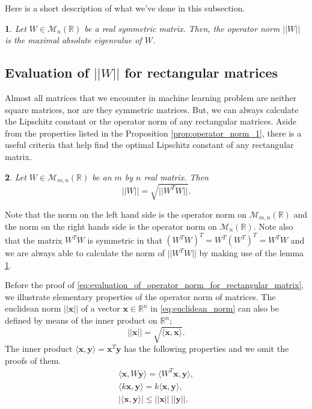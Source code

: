 \documentclass[12pt]{report}
\numberwithin{figure}{chapter}
\theoremstyle{plain}
\newtheorem{theorem}{\protect\theoremname}[chapter]
\theoremstyle{definition}
\theoremstyle{corollary}
\theoremstyle{definition}
\theoremstyle{plain}
\theoremstyle{definition}
\theoremstyle{plain}
\newtheorem{lemma}[theorem]{\protect\lemmaname}
\providecommand{\lemmaname}{Lemma}
\providecommand{\theoremname}{Theorem}
\newcommand\bx{\ensuremath{\boldsymbol x}}
\newcommand\by{\ensuremath{\boldsymbol y}}
\begin{document}
Here is a short description of what we've done in this subsection.
\begin{lemma}\label{lemm:evaluation_for_square_matrices}
Let \(W\in\mathcal M_n(\mathbb R)\) be a real symmetric matrix.
Then, the operator norm \(||W||\) is the maximal absolute eigenvalue of \(W\).
\end{lemma}

%
\subsection{Evaluation of \(||W||\) for rectangular matrices}\label{sec:evaluation_for_rectangular_matrices}
Almost all matrices that we encounter in machine learning problem are neither square matrices, nor are they symmetric matrices.
But, we can always calculate the Lipschitz constant or the operator norm of any rectangular matrices.
Aside from the properties listed in the Proposition \ref{prop:operator_norm_1}, there is a useful criteria that help find the optimal Lipschitz constant of any rectangular matrix.

\begin{theorem}\label{theo:evaluation_for_rectangular_matrices}
\cite{KC}
Let \(W\in\mathcal M_{m,n}(\mathbb R)\) be an \(m\) by \(n\) real matrix.
Then
\begin{equation}\label{eq:evaluation_of_operator_norm_for_rectangular_matrix}
||W||=\sqrt{||W^TW||}.
\end{equation}
\end{theorem}

Note that the norm on the left hand side is the operator norm on \(\mathcal M_{m,n}(\mathbb R)\) and the norm on the right hands side is the operator norm on \(\mathcal M_n(\mathbb R)\).
Note also that the matrix \(W^TW\) is symmetric in that \((W^TW)^T=W^T(W^T)^T=W^TW\) and we are always able to calculate the norm of \(||W^TW||\) by making use of the lemma \ref{lemm:evaluation_for_square_matrices}.

Before the proof of \eqref{eq:evaluation_of_operator_norm_for_rectangular_matrix}, we illustrate elementary properties of the operator norm of matrices.
The euclidean norm \(||\bx||\) of a vector \(\bx\in\mathbb R^n\) in \eqref{eq:euclidean_norm} can also be defined by means of the inner product on \(\mathbb R^n\);
\begin{equation}\label{eq:euclidean norm_2}
||\bx||=\sqrt{\langle \bx,\bx\rangle}.
\end{equation}
The inner product \(\langle \bx,\by\rangle=\bx^T\by\) has the following properties and we omit the proofs of them.
\begin{gather*}
\langle \bx,W\by\rangle=\langle W^T\bx,\by\rangle,\\
\langle k\bx,\by\rangle=k\langle \bx,\by\rangle,\\
|\langle\bx,\by\rangle|\le||\bx||\:||\by||.
\end{gather*}
\end{document}
